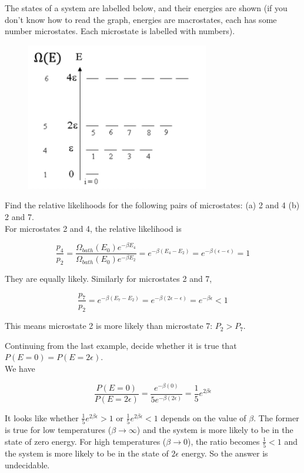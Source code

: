 \documentclass[12pt, a4paper]{article}
\newcounter{exa}
\begin{document}
\begin{texample}
The states of a system are labelled below, and their energies are shown (if you don't know how to read the graph, energies are macrostates, each has some number microstates. Each microstate is labelled with numbers).

\begin{figure}[H]
\centering
\includegraphics[width=80mm]{14.png}
\end{figure}

Find the relative likelihoods for the following pairs of microstates: (a) 2 and 4 (b) 2 and 7. \\

For microstates 2 and 4, the relative likelihood is

$$\frac{p_4}{p_2}=\frac{\Omega_{bath}(E_0)e^{-\beta E_4}}{\Omega_{bath}(E_0)e^{-\beta E_2}}=e^{-\beta(E_4-E_2)}=e^{-\beta(\epsilon-\epsilon)}=1$$

They are equally likely. Similarly for microstates 2 and 7,

$$\frac{p_7}{p_2}=e^{-\beta(E_7-E_2)}=e^{-\beta(2\epsilon-\epsilon)}=e^{-\beta\epsilon}<1$$

This means microstate 2 is more likely than microstate 7: $P_2>P_7$.
\end{texample}

\begin{texample}
Continuing from the last example, decide whether it is true that $P(E=0)=P(E=2\epsilon)$. \\

We have

$$\frac{P(E=0)}{P(E=2\epsilon)}=\frac{e^{-\beta(0)}}{5e^{-\beta(2\epsilon)}}=\frac15 e^{2\beta\epsilon}$$

It looks like whether $\frac15 e^{2\beta\epsilon} >1$ or $\frac15 e^{2\beta\epsilon} < 1$ depends on the value of $\beta$. The former is true for low temperatures ($\beta\to\infty$) and the system is more likely to be in the state of zero energy. For high temperatures ($\beta\to0$), the ratio becomes $\frac{1}{5}<1$ and the system is more likely to be in the state of $2\epsilon$ energy. So the answer is undecidable.
\end{texample}
\end{document}
